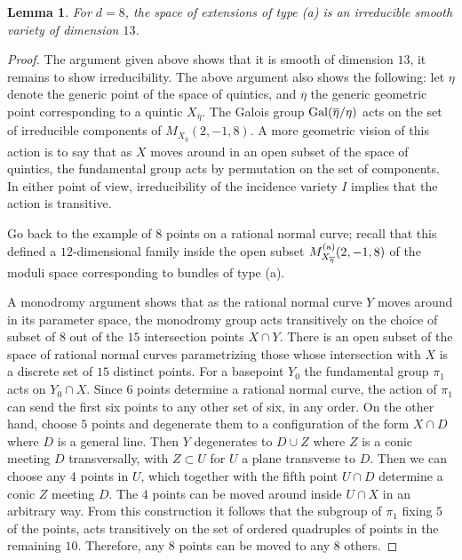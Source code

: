 \documentclass{amsart}
\theoremstyle{plain}
\newtheorem{lemma}[theorem]{Lemma}
\numberwithin{equation}{section}
\begin{document}
\begin{lemma}
\label{Ma}
For $d=8$, 
the space of extensions of type (a) is an irreducible smooth variety of dimension $13$.
\end{lemma}
\begin{proof}
The argument given above shows that it is smooth of dimension $13$, it remains to show
irreducibility. The above argument also shows the following: let $\eta$ denote the
generic point of the space of quintics, and $\overline{\eta}$ the generic geometric point
corresponding to a quintic $X_{\overline{\eta}}$. The Galois group ${\rm Gal} (\overline{\eta}/\eta )$ acts on the set of irreducible components of $M_{X_{\overline{\eta}}}(2,-1,8)$.
A more geometric vision of this action is to say that as $X$ moves around in an open
subset of the space of quintics, the fundamental group acts by permutation on the
set of components. In either point of view, irreducibility of the incidence variety
$I$ implies that the action is transitive. 

Go back to the example of $8$ points on a rational normal curve; recall that this defined a
$12$-dimensional family inside the open subset 
$M^{{\rm (a)}}_{X_{\overline{\eta}}}(2,-1,8)$ of the moduli space corresponding
to bundles of type (a).

A monodromy
argument shows that as the rational normal curve $Y$ moves around in its parameter space, 
the monodromy group acts transitively on the choice of subset
of $8$ out of the $15$ intersection points $X\cap Y$. There is an open subset of 
the space of rational normal curves parametrizing those whose intersection with
$X$ is a discrete set of $15$ distinct points. For a basepoint $Y_0$ the fundamental
group $\pi _1$ acts on $Y_0\cap X$. Since $6$ points determine a rational normal curve,
the action of $\pi _1$ can send the first six points to any other set of six, in 
any order. On the other hand, choose $5$ points and degenerate them to a configuration
of the form $X\cap D$ where $D$ is a general line. Then $Y$ degenerates to $D\cup Z$
where $Z$ is a conic meeting $D$ transversally, with $Z\subset U$ for $U$ a plane
transverse to $D$.  Then we can choose any $4$ points in $U$, which together with the fifth
point $U\cap D$ determine a conic $Z$ meeting $D$. The $4$ points can be moved around 
inside $U\cap X$ in an arbitrary way. From this construction it follows that 
the subgroup of $\pi _1$ fixing $5$ of the points, acts transitively on the set of
ordered quadruples of points in the remaining $10$. Therefore, any $8$ points can be moved to
any $8$ others. 


\end{proof}
\end{document}

